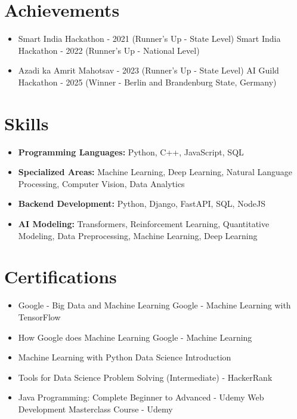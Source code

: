 \documentclass[a4paper,10pt]{article}
\begin{document}
\section*{Achievements}
\begin{itemize}
\item Smart India Hackathon - 2021 (Runner's Up - State Level) \hfill Smart India Hackathon - 2022 (Runner's Up - National Level)
\item Azadi ka Amrit Mahotsav - 2023 (Runner's Up - State Level) \hfill AI Guild Hackathon - 2025 (Winner - Berlin and Brandenburg State, Germany)
\end{itemize}

\section*{Skills}
\begin{itemize}
  \item \textbf{Programming Languages:} Python, C++, JavaScript, SQL
  \item \textbf{Specialized Areas:} Machine Learning, Deep Learning, Natural Language Processing, Computer Vision, Data Analytics
  \item \textbf{Backend Development:} Python, Django, FastAPI, SQL, NodeJS
  \item \textbf{AI Modeling:} Transformers, Reinforcement Learning, Quantitative Modeling, Data Preprocessing, Machine Learning, Deep Learning
\end{itemize}

\section*{Certifications}
\begin{itemize}
\item Google - Big Data and Machine Learning \hfill Google - Machine Learning with TensorFlow
\item How Google does Machine Learning \hfill Google - Machine Learning
\item Machine Learning with Python \hfill Data Science Introduction
\item Tools for Data Science \hfill Problem Solving (Intermediate) - HackerRank
\item Java Programming: Complete Beginner to Advanced - Udemy \hfill Web Development Masterclass Course - Udemy
\end{itemize}
\end{document}
